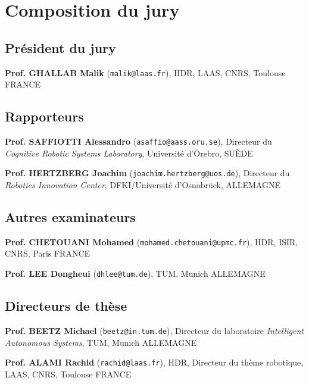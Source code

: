 \documentclass[a4paper]{article}
\begin{document}
\section{Composition du jury}

\subsection{Président du jury}

\textbf{Prof. GHALLAB Malik} ({\tt malik@laas.fr}), HDR, LAAS, CNRS, Toulouse FRANCE


\subsection{Rapporteurs}

\textbf{Prof. SAFFIOTTI Alessandro} ({\tt asaffio@aass.oru.se}), Directeur du \emph{Cognitive Robotic Systems Laboratory}, Université d'Örebro, SUÈDE

\textbf{Prof. HERTZBERG Joachim} ({\tt joachim.hertzberg@uos.de}), Directeur du \emph{Robotics Innovation Center}, DFKI/Université d'Osnabrück, ALLEMAGNE

\subsection{Autres examinateurs}

\textbf{Prof. CHETOUANI Mohamed} ({\tt mohamed.chetouani@upmc.fr}), HDR, ISIR, CNRS, Paris FRANCE

\textbf{ Prof. LEE Dongheui} ({\tt dhlee@tum.de}), TUM, Munich ALLEMAGNE 

\subsection{Directeurs de thèse}

\textbf{Prof. BEETZ Michael} ({\tt beetz@in.tum.de}), Directeur du laboratoire \emph{Intelligent Autonomous Systems}, TUM, Munich ALLEMAGNE 

\textbf{Prof. ALAMI Rachid} ({\tt rachid@laas.fr}), HDR, Directeur du thème robotique, LAAS, CNRS, Toulouse FRANCE 
\end{document}
